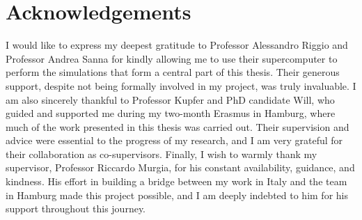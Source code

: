 \chapter*{Acknowledgements}
I would like to express my deepest gratitude to Professor Alessandro Riggio and Professor Andrea Sanna for kindly allowing me to use their supercomputer to perform the simulations that form a central part of this thesis. Their generous support, despite not being formally involved in my project, was truly invaluable.
I am also sincerely thankful to Professor Kupfer and PhD candidate Will, who guided and supported me during my two-month Erasmus in Hamburg, where much of the work presented in this thesis was carried out. Their supervision and advice were essential to the progress of my research, and I am very grateful for their collaboration as co-supervisors.
Finally, I wish to warmly thank my supervisor, Professor Riccardo Murgia, for his constant availability, guidance, and kindness. His effort in building a bridge between my work in Italy and the team in Hamburg made this project possible, and I am deeply indebted to him for his support throughout this journey.

% 
% 
% 





